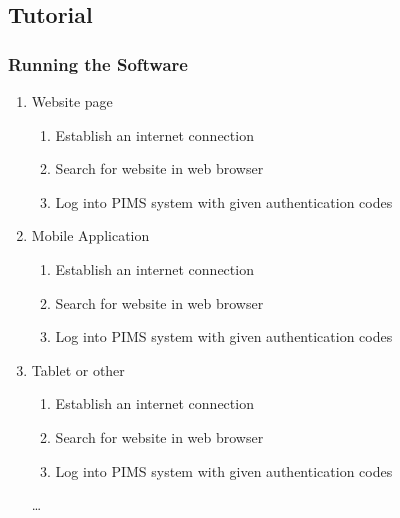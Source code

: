\documentclass[a4paper]{article}
\begin{document}
\subsection{Tutorial}
\subsubsection{Running the Software}
\begin{enumerate}
  \item Website page
  \begin{enumerate}
  \item Establish an internet connection
    \item Search for website in web browser
    \item Log into PIMS system with given authentication codes
  \end{enumerate}
  \item Mobile Application
   \begin{enumerate}
   \item Establish an internet connection
    \item Search for website in web browser
    \item Log into PIMS system with given authentication codes
  \end{enumerate}
  \item Tablet or other
   \begin{enumerate}
\item Establish an internet connection  
    \item Search for website in web browser
    \item Log into PIMS system with given authentication codes
  \end{enumerate} \ldots
\end{enumerate}
\end{document}
